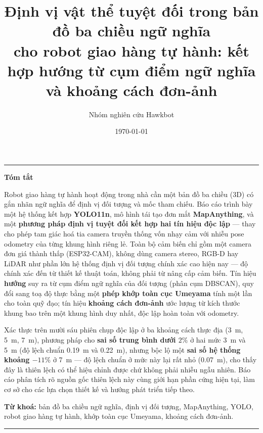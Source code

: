 \documentclass[10pt,a4paper,twocolumn]{article}
\title{\textbf{Định vị vật thể tuyệt đối trong bản đồ ba chiều ngữ nghĩa\\
cho robot giao hàng tự hành: kết hợp hướng từ cụm điểm ngữ nghĩa\\
và khoảng cách đơn-ảnh}}
\author{Nhóm nghiên cứu Hawkbot}
\date{\today}
\begin{document}
\raggedbottom
\maketitle

\begin{center}
\rule{0.9\columnwidth}{0.5pt}
\end{center}
{\large\bfseries Tóm tắt\par}
\vspace{0.3em}

Robot giao hàng tự hành hoạt động trong nhà cần một bản đồ ba chiều (3D) có gắn nhãn ngữ nghĩa để định vị đối tượng và mốc tham chiếu. Báo cáo trình bày một hệ thống kết hợp \textbf{YOLO11n}, mô hình tái tạo đơn mắt \textbf{MapAnything}, và một \textbf{phương pháp định vị tuyệt đối kết hợp hai tín hiệu độc lập} — thay cho phép tam giác hoá tia camera truyền thống vốn nhạy cảm với nhiễu pose odometry của từng khung hình riêng lẻ. Toàn bộ cảm biến chỉ gồm một camera đơn giá thành thấp (ESP32-CAM), không dùng camera stereo, RGB-D hay LiDAR như phần lớn hệ thống định vị đối tượng chính xác cao hiện nay — độ chính xác đến từ thiết kế thuật toán, không phải từ nâng cấp cảm biến. Tín hiệu \textbf{hướng} suy ra từ cụm điểm ngữ nghĩa của đối tượng (phân cụm DBSCAN), quy đổi sang toạ độ thực bằng một \textbf{phép khớp toàn cục Umeyama} tính một lần cho toàn quỹ đạo; tín hiệu \textbf{khoảng cách đơn-ảnh} ước lượng từ kích thước khung bao trên một khung hình duy nhất, độc lập hoàn toàn với odometry.

Xác thực trên mười sáu phiên chụp độc lập ở ba khoảng cách thực địa (\SI{3}{\meter}, \SI{5}{\meter}, \SI{7}{\meter}), phương pháp cho \textbf{sai số trung bình dưới $2\%$} ở hai mức \SI{3}{\meter} và \SI{5}{\meter} (độ lệch chuẩn \SI{0.19}{\meter} và \SI{0.22}{\meter}), nhưng bộc lộ một \textbf{sai số hệ thống khoảng $-11\%$} ở \SI{7}{\meter} — độ lệch chuẩn ở mức này lại rất nhỏ (\SI{0.07}{\meter}), cho thấy đây là thiên lệch có thể hiệu chỉnh được chứ không phải nhiễu ngẫu nhiên. Báo cáo phân tích rõ nguồn gốc thiên lệch này cùng giới hạn phần cứng hiện tại, làm cơ sở cho các lựa chọn thiết kế và hướng phát triển tiếp theo.

\smallskip
\noindent\textbf{Từ khoá:} bản đồ ba chiều ngữ nghĩa, định vị đối tượng, MapAnything, YOLO, robot giao hàng tự hành, khớp toàn cục Umeyama, khoảng cách đơn-ảnh.

\begin{center}
\rule{0.9\columnwidth}{0.5pt}
\end{center}
\vspace{0.6em}
\end{document}
